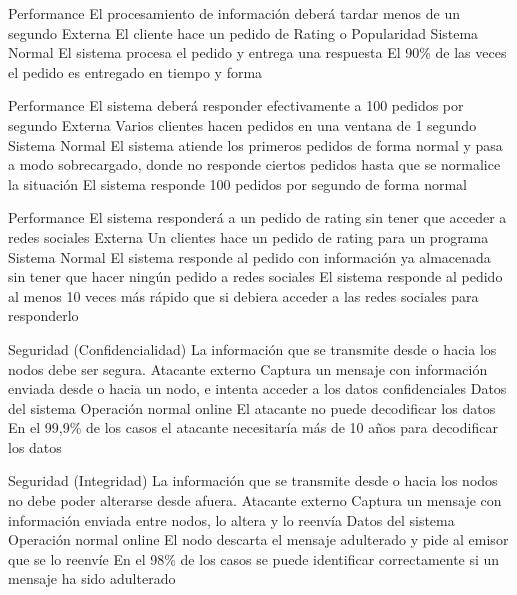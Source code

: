 \begin{enumerate}
\QA
  {Performance} %
  {El procesamiento de información deberá tardar menos de un segundo} %
  {Externa} %
  {El cliente hace un pedido de Rating o Popularidad} %
  {Sistema} %
  {Normal} %
  {El sistema procesa el pedido y entrega una respuesta} %
  {El 90\% de las veces el pedido es entregado en tiempo y forma} %

\QA
  {Performance} %
  {El sistema deberá responder efectivamente a 100 pedidos por segundo} %
  {Externa} %
  {Varios clientes hacen pedidos en una ventana de 1 segundo} %
  {Sistema} %
  {Normal} %
  {El sistema atiende los primeros pedidos de forma normal y pasa a modo sobrecargado, donde no responde ciertos pedidos hasta que se normalice la situación} %
  {El sistema responde 100 pedidos por segundo de forma normal} %

\QA
  {Performance} %
  {El sistema responderá a un pedido de rating sin tener que acceder a redes sociales} %
  {Externa} %
  {Un clientes hace un pedido de rating para un programa} %
  {Sistema} %
  {Normal} %
  {El sistema responde al pedido con información ya almacenada sin tener que hacer ningún pedido a redes sociales} %
  {El sistema responde al pedido al menos 10 veces más rápido que si debiera acceder a las redes sociales para responderlo} %



\QA
  {Seguridad (Confidencialidad)} %
  {La información que se transmite desde o hacia los nodos debe ser segura.} %
  {Atacante externo} %
  {Captura un mensaje con información enviada desde o hacia un nodo, e intenta acceder a los datos confidenciales} %
  {Datos del sistema} %
  {Operación normal online} %
  {El atacante no puede decodificar los datos} %
  {En el 99,9\% de los casos el atacante necesitaría más de 10 años para decodificar los datos} %

\QA
  {Seguridad (Integridad)} %
  {La información que se transmite desde o hacia los nodos no debe poder alterarse desde afuera.} %
  {Atacante externo} %
  {Captura un mensaje con información enviada entre nodos, lo altera y lo reenvía} %
  {Datos del sistema} %
  {Operación normal online} %
  {El nodo descarta el mensaje adulterado y pide al emisor que se lo reenvíe} %
  {En el 98\% de los casos se puede identificar correctamente si un mensaje ha sido adulterado} %


\end{enumerate}
